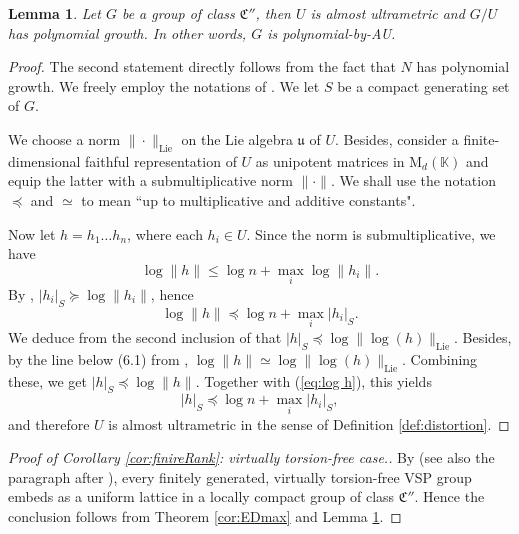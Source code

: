 \documentclass[11pt,leqno]{article}
\theoremstyle{plain}
\newtheorem{lemma}[theorem]{Lemma}
\theoremstyle{definition}
\theoremstyle{remark}
\numberwithin{equation}{section}
\newcommand{\K}{\mathbb{K}}
\begin{document}
\begin{lemma}\label{lem:C''}
Let $G$ be a group of class $\mathfrak{C}''$, then $U$ is almost ultrametric and $G/U$ has polynomial growth. In other words, $G$ is polynomial-by-AU.
\end{lemma}
\begin{proof}
The second statement directly follows from the fact that $N$ has polynomial growth. We freely employ the notations of \cite[\S 6]{CT}. 
We let $S$ be a compact generating set of $G$.

We choose a norm $\|\cdot\|_{\mathrm{Lie}}$ on the Lie algebra $\mathfrak{u}$ of $U$. Besides, consider a finite-dimensional faithful representation of $U$ as unipotent matrices in  $\text{M}_d(\K)$ and equip the latter with a submultiplicative norm $\|\cdot\|$. 
 We shall use the notation $\preceq$ and $ \simeq$ to mean ``up to multiplicative and additive constants". 
 
 
 Now let $h=h_1\ldots h_n$, where each $h_i\in U$. Since the norm is submultiplicative, we have 
 \[\log \|h\|\leq \log n+ \max_i\log \|h_i\|.\]
By \cite[Lemma 6.12]{CT}, $|h_i|_S\succeq \log \|h_i\|$, hence 
  \begin{equation}\label{eq:log h}\log \|h\|\preceq  \log n+ \max_i|h_i|_S.\end{equation}
We deduce from the second inclusion of \cite[Lemma 6.4]{CT} that $|h|_S\preceq \log \|\log(h)\|_{\mathrm{Lie}}$. Besides, by the line below (6.1) from \cite{CT}, $\log \|h\|\simeq \log \|\log(h)\|_{\mathrm{Lie}}$. Combining these, we get $|h|_S\preceq \log \|h\|$. Together with  (\ref{eq:log h}), this yields
\[|h|_S\preceq  \log n+ \max_i |h_i|_S,\]
and therefore $U$ is almost ultrametric in the sense of Definition \ref{def:distortion}.
\end{proof}

\begin{proof}[Proof of Corollary \ref{cor:finireRank}: virtually torsion-free case.]
By \cite[Theorem 1.16]{CT} (see also the paragraph after \cite[Theorem 1.12]{CT}), every finitely generated, virtually torsion-free VSP group embeds as a uniform lattice in a locally compact group of class $\mathfrak{C}''$. Hence the conclusion follows from Theorem \ref{cor:EDmax} and Lemma \ref{lem:C''}.
\end{proof}
\end{document}
